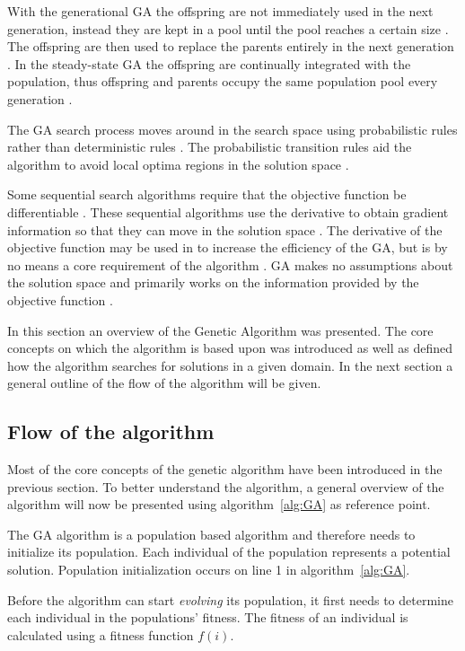 With the generational GA the offspring are not immediately used in the next generation, instead they are kept in a pool until the pool reaches a certain size \cite{FamilyGA}. The offspring are then used to replace the parents entirely in the next generation \cite{FamilyGA}. In the steady-state GA the offspring are continually integrated with the population, thus offspring and parents occupy the same population pool every generation \cite{GeostatisticalGA,FamilyGA}.

The GA search process moves around in the search space using probabilistic rules rather than deterministic rules \cite{FamilyGA}. The probabilistic transition rules aid the algorithm to avoid local optima regions in the solution space \cite{HybridIntelliGA}. 

Some sequential search algorithms require that the objective function be differentiable \cite{ConstrainedGA}. These sequential algorithms use the derivative to obtain gradient information so that they can move in the solution space \cite{ConstrainedGA,SelfAdaptiveGA}. The derivative of the objective function may be used in to increase the efficiency of the GA, but is by no means a core requirement of the algorithm \cite{ConstrainedGA,HybridIntelliGA,SelfAdaptiveGA}. GA makes no assumptions about the solution space and primarily works on the information provided by the objective function \cite{ConstrainedGA,HybridIntelliGA}. 

In this section an overview of the Genetic Algorithm was presented. The core concepts on which the algorithm is based upon was introduced as well as defined how the algorithm searches for solutions in a given domain. In the next section a general outline of the flow of the algorithm will be given.

\subsection{Flow of the algorithm}
Most of the core concepts of the genetic algorithm have been introduced in the previous section. To better understand the algorithm, a general overview of the algorithm will now be presented using algorithm~\ref{alg:GA} as reference point.

The GA algorithm is a population based algorithm and therefore needs to initialize its population. Each individual of the population represents a potential solution. Population initialization occurs on line 1 in algorithm~\ref{alg:GA}.

Before the algorithm can start \emph{evolving} its population, it first needs to determine each individual in the populations' fitness. The fitness of an individual is calculated using a fitness function $f(i)$.

